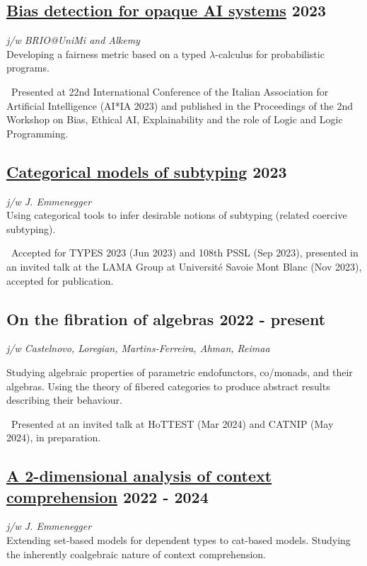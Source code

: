 \documentclass[a4paper,9pt]{article}
\begin{document}
\subsection*{\href{https://ceur-ws.org/Vol-3615/paper4.pdf}{Bias detection for opaque AI systems} \hfill 2023}
\textit{j/w BRIO@UniMi and Alkemy}\\
Developing a fairness metric based on a typed $\lambda$-calculus for probabilistic programs.

\, Presented at 22nd International Conference of the Italian Association for Artificial Intelligence (AI*IA 2023) and published in the Proceedings of the 2nd Workshop on Bias, Ethical AI, Explainability and the role of Logic and Logic Programming.

\subsection*{\href{https://arxiv.org/abs/2312.14600}{Categorical models of subtyping} \hfill 2023}
\textit{j/w J. Emmenegger}\\
Using categorical tools to infer desirable notions of subtyping (related coercive subtyping).

\, Accepted for TYPES 2023 (Jun 2023) and 108th PSSL (Sep 2023), presented in an invited talk at the LAMA Group at Université Savoie Mont Blanc (Nov 2023), accepted for publication.

\subsection*{On the fibration of algebras \hfill 2022 - present}
\begin{flushright}
\vspace{-.8em}
\textit{j/w Castelnovo, Loregian, Martins-Ferreira, Ahman, Reimaa}
\end{flushright}
\vspace{-.5em}
Studying algebraic properties of parametric endofunctors, co/monads, and their algebras. Using the theory of fibered categories to produce abstract results describing their behaviour.

\, Presented at an invited talk at HoTTEST (Mar 2024) and CATNIP (May 2024), in preparation.

\subsection*{\href{https://arxiv.org/abs/2403.03085}{A 2-dimensional analysis of context comprehension} \hfill 2022 - 2024}
\textit{j/w J. Emmenegger}\\
Extending set-based models for dependent types to cat-based models. Studying the inherently coalgebraic nature of context comprehension.
\end{document}
